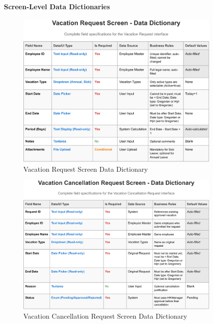 \documentclass[12pt,a4paper]{article}
\begin{document}
\paragraph{Screen-Level Data Dictionaries}
\begin{figure}[H]
\centering
\includegraphics[width=0.9\textwidth]{Data-Dictionary/Screen-Data-Dictionaries/Vacation-Request-Screen-Data-Dictionary/Vacation-Request-Screen-Data-Dictionary-1.png}
\caption{Vacation Request Screen Data Dictionary}
\label{fig:vacation-request-data-dict}
\end{figure}

\begin{figure}[H]
\centering
\includegraphics[width=0.9\textwidth]{Data-Dictionary/Screen-Data-Dictionaries/Vacation-Cancellation-Request-Screen-Data-Dictionary/Vacation-Cancellation-Request-Screen-Data-Dictionary-1.png}
\caption{Vacation Cancellation Request Screen Data Dictionary}
\label{fig:vacation-cancellation-data-dict}
\end{figure}
\end{document}

